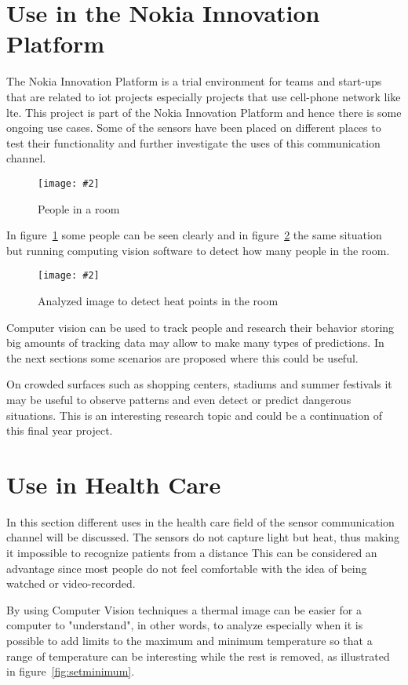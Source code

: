 \documentclass[hidelinks,11pt,a4paper,oneside,article]{memoir}
\newcommand{\putimage}[3][10] %
{
\begin{figure}[h]
	\centering
	\captionsetup{justification=centering}
	\texttt{[image: \#2]}
	\caption{#3}
	\label{fig:#2}
\end{figure}
}
\begin{document}
\section{Use in the Nokia Innovation Platform}\label{sec:use-in-the-nokia-innovation-platform}
The Nokia Innovation Platform is a trial environment for teams and start-ups that are related to \gls{iot} projects especially projects that use cell-phone network like \gls{lte}. This project is part of the Nokia Innovation Platform and hence there is some ongoing use cases. Some of the sensors have been placed on different places to test their functionality and further investigate the uses of this communication channel.

	\putimage[6]{people}{People in a room}
	
In figure~\ref{fig:people} some people can be seen clearly and in figure~\ref{fig:analysed} the same situation but running computing vision software to detect how many people in the room.

	\putimage[6]{analysed}{Analyzed image to detect heat points in the room}

Computer vision can be used to track people and research their behavior storing big amounts of tracking data may allow to make many types of predictions. In the next sections some scenarios are proposed where this could be useful.

On crowded surfaces such as shopping centers, stadiums and summer festivals it may be useful to observe patterns and even detect or predict dangerous situations. This is an interesting research topic and could be a continuation of this final year project.


\section{Use in Health Care}
In this section different uses in the health care field of the sensor communication channel will be discussed. The sensors do not capture light but heat, thus making it impossible to recognize patients from a distance This can be considered an advantage since most people do not feel comfortable with the idea of being watched or video-recorded.

 By using Computer Vision techniques a thermal image can be easier for a computer to "understand", in other words, to analyze especially when it is possible to add limits to the maximum and minimum temperature so that a range of temperature can be interesting while the rest is removed, as illustrated in figure~\ref{fig:setminimum}.
    
\end{document}
